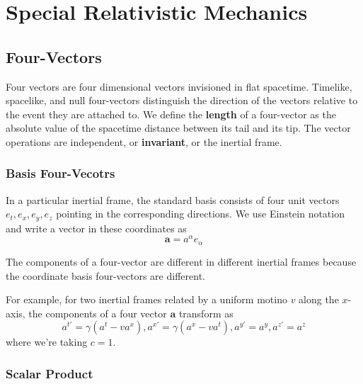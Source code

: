 %
%
%
\chapter{Special Relativistic Mechanics}
\label{SpecMech} %




\section{Four-Vectors}
\label{sec:fourVect}

Four vectors are four dimensional vectors invisioned in flat spacetime. Timelike, spacelike, and null four-vectors distinguish the direction of the vectors relative to the event they are attached to. We define the \textbf{length} of a four-vector as the absolute value of the spacetime distance between its tail and its tip. The vector operations are independent, or \textbf{invariant}, or the inertial frame.

\subsection{Basis Four-Vecotrs}

In a particular inertial frame, the standard basis consists of four unit vectors $e_t,e_x,e_y,e_z$ pointing in the corresponding directions. We use Einstein notation and write a vector in these coordinates as $$\mathbf{a} = a^{\alpha}e_{\alpha}$$

\begin{nte}
    The components of a four-vector are different in different inertial frames because the coordinate basis four-vectors are different.
\end{nte}

For example, for two inertial frames related by a uniform motino $v$ along the $x$-axis, the components of a four vector $\mathbf{a}$ transform as $$a^{t'} = \gamma(a^t-va^x),a^{x'} = \gamma(a^x - va^t), a^{y'} = a^y, a^{z'} = a^z$$
where we're taking $c = 1$.

\subsection{Scalar Product}

